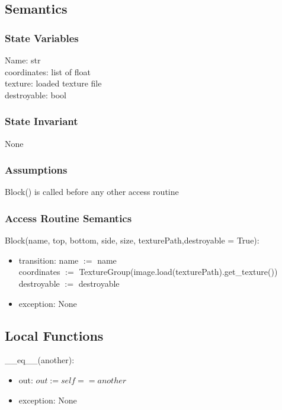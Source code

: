 \documentclass{article}
\begin{document}
\subsection {Semantics}

\subsubsection {State Variables}
Name: str\\
coordinates: list of float\\
texture: loaded texture file\\
destroyable: bool

\subsubsection {State Invariant}
None

\subsubsection {Assumptions}
Block() is called before any other access routine

\subsubsection {Access Routine Semantics}
\noindent Block(name, top, bottom, side, size, texturePath,destroyable = True):
\begin{itemize}
\item transition: name $:=$ name\\
    coordinates $:=$ TextureGroup(image.load(texturePath).get\_texture())\\
    destroyable $:=$ destroyable
\item exception: None
\end{itemize}\vspace{6mm}

\subsection{Local Functions}

\noindent \_\_eq\_\_(another):
\begin{itemize}
\item out: $out:=self==another$
\item exception: None
\end{itemize}\vspace{6mm}
\end{document}
